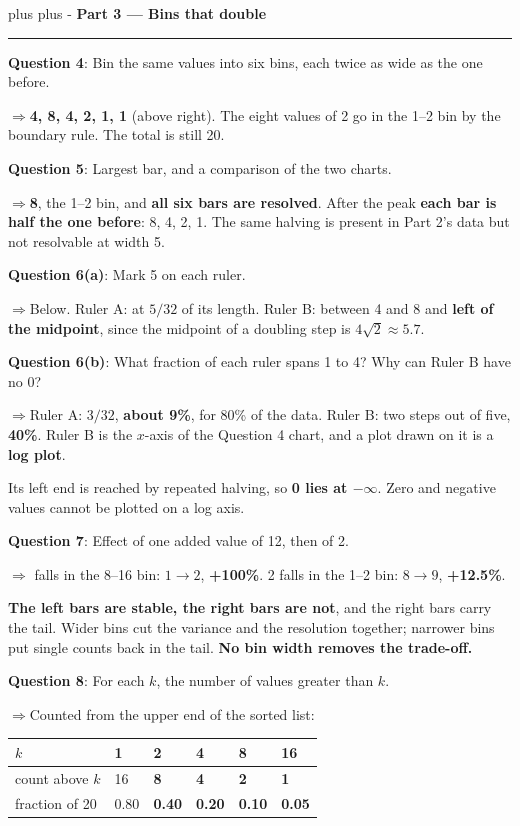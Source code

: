 \documentclass[a4paper, 11pt]{extarticle}
\newcommand{\needroom}[1]{%
  \par
  \begingroup
    \setlength{\dimen0}{#1}%
    \vskip 0pt plus \dimen0
    \penalty -100%
    \vskip 0pt plus -\dimen0
  \endgroup}
\newcommand{\parthead}[2]{%
  \needroom{6\baselineskip}%
  \partheadhere{#1}{#2}}
\newcommand{\partheadhere}[2]{%
  \vspace{0.5em}
  {\large\bfseries Part #1 --- #2}\par
  \vspace{-0.4em}\rule{\textwidth}{0.8pt}\par
  \vspace{0.1em}}
\newcommand{\ans}[1]{\textbf{\textcolor{pltblue!75!black}{#1}}}
\newcommand{\arrow}{\textcolor{pltblue!75!black}{$\Rightarrow$}\;}
\begin{document}
\parthead{3}{Bins that double}

{\bf Question 4}: Bin the same values into six bins, each twice as wide as the
one before.

\arrow \ans{4, 8, 4, 2, 1, 1} (above right). The eight values of 2 go in the
1--2 bin by the boundary rule. The total is still 20.

{\bf Question 5}: Largest bar, and a comparison of the two charts.

\arrow \ans{8}, the 1--2 bin, and \ans{all six bars are resolved}. After the
peak \ans{each bar is half the one before}: 8, 4, 2, 1. The same halving is
present in Part 2's data but not resolvable at width 5.

{\bf Question 6(a)}: Mark 5 on each ruler.

\arrow Below. Ruler A: at $5/32$ of its length. Ruler B: between 4 and 8 and
\ans{left of the midpoint}, since the midpoint of a doubling step is
$4\sqrt{2} \approx 5.7$.

\begin{center}
\end{center}

{\bf Question 6(b)}: What fraction of each ruler spans 1 to 4? Why can Ruler B
have no 0?

\arrow Ruler A: $3/32$, \ans{about 9\%}, for 80\% of the data. Ruler B: two
steps out of five, \ans{40\%}. Ruler B is the $x$-axis of the Question 4
chart, and a plot drawn on it is a \ans{log plot}.

Its left end is reached by repeated halving, so \ans{0 lies at $-\infty$}.
Zero and negative values cannot be plotted on a log axis.

{\bf Question 7}: Effect of one added value of 12, then of 2.

\arrow 12 falls in the 8--16 bin: $1 \to 2$, \ans{+100\%}. 2 falls in the
1--2 bin: $8 \to 9$, \ans{+12.5\%}.

\ans{The left bars are stable, the right bars are not}, and the right bars
carry the tail. Wider bins cut the variance and the resolution together;
narrower bins put single counts back in the tail. \ans{No bin width removes the
trade-off.}

{\bf Question 8}: For each $k$, the number of values greater than $k$.

\arrow Counted from the upper end of the sorted list:

\begin{center}
{\setlength{\tabcolsep}{6pt}\renewcommand{\arraystretch}{1.3}
\begin{tabular}{|l|C{1.6cm}|C{1.6cm}|C{1.6cm}|C{1.6cm}|C{1.6cm}|}
\hline
$k$ & 1 & 2 & 4 & 8 & 16 \\
\hline
count above $k$ & 16 & \ans{8} & \ans{4} & \ans{2} & \ans{1} \\
\hline
fraction of 20 & 0.80 & \ans{0.40} & \ans{0.20} & \ans{0.10} & \ans{0.05} \\
\hline
\end{tabular}}
\end{center}
\end{document}
